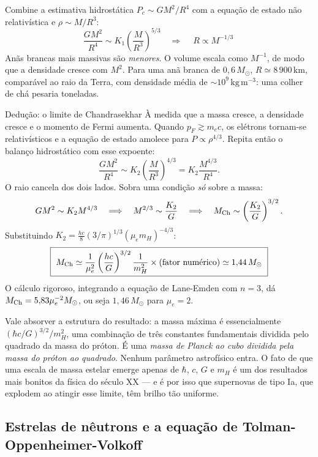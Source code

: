 \documentclass[11pt,a4paper]{article}
\begin{document}
Combine a estimativa hidrostática $P_c\sim GM^{2}/R^{4}$ com a equação de estado não relativística e $\rho\sim M/R^{3}$:
\[
\frac{GM^{2}}{R^{4}}\sim K_1\left(\frac{M}{R^{3}}\right)^{5/3}
\quad\Longrightarrow\quad
\boxed{\ R\propto M^{-1/3}\ }
\]
Anãs brancas mais massivas são \emph{menores}. O volume escala como $M^{-1}$, de modo que a densidade cresce com $M^{2}$. Para uma anã branca de $0{,}6\,M_\odot$, $R\simeq8\,900\,\mathrm{km}$, comparável ao raio da Terra, com densidade média de $\sim10^{9}\,\mathrm{kg\,m^{-3}}$: uma colher de chá pesaria toneladas.

\begin{lessonblock}[borderline west={2pt}{0pt}{astroGold}]{Dedução: o limite de Chandrasekhar}
À medida que a massa cresce, a densidade cresce e o momento de Fermi aumenta. Quando $p_F\gtrsim m_ec$, os elétrons tornam-se relativísticos e a equação de estado amolece para $P\propto\rho^{4/3}$. Repita então o balanço hidrostático com esse expoente:
\[
\frac{GM^{2}}{R^{4}}\sim K_2\left(\frac{M}{R^{3}}\right)^{4/3}=K_2\frac{M^{4/3}}{R^{4}}.
\]
O raio cancela dos dois lados. Sobra uma condição \emph{só} sobre a massa:
\[
GM^{2}\sim K_2M^{4/3}
\quad\Longrightarrow\quad
M^{2/3}\sim\frac{K_2}{G}
\quad\Longrightarrow\quad
M_{\rm Ch}\sim\left(\frac{K_2}{G}\right)^{3/2}.
\]
Substituindo $K_2=\frac{hc}{8}(3/\pi)^{1/3}(\mu_em_H)^{-4/3}$:
\[
\boxed{\ M_{\rm Ch}\simeq\frac{1}{\mu_e^{2}}\left(\frac{hc}{G}\right)^{3/2}\frac{1}{m_H^{2}}\times\text{(fator numérico)}\simeq1{,}44\,M_\odot\ }
\]
O cálculo rigoroso, integrando a equação de Lane-Emden com $n=3$, dá $M_{\rm Ch}=5{,}83\mu_e^{-2}M_\odot$, ou seja $1{,}46\,M_\odot$ para $\mu_e=2$.

Vale absorver a estrutura do resultado: a massa máxima é essencialmente $(\hbar c/G)^{3/2}/m_H^{2}$, uma combinação de três constantes fundamentais dividida pelo quadrado da massa do próton. É uma \emph{massa de Planck ao cubo dividida pela massa do próton ao quadrado}. Nenhum parâmetro astrofísico entra. O fato de que uma escala de massa estelar emerge apenas de $\hbar$, $c$, $G$ e $m_H$ é um dos resultados mais bonitos da física do século XX --- e é por isso que supernovas de tipo Ia, que explodem ao atingir esse limite, têm brilho tão uniforme.
\end{lessonblock}

\subsection*{Estrelas de nêutrons e a equação de Tolman-Oppenheimer-Volkoff}
\end{document}
